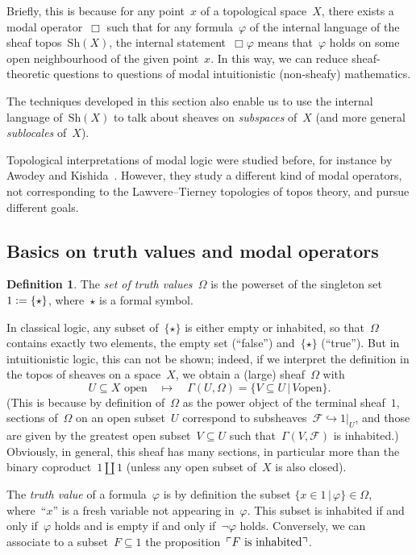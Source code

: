 \documentclass[10pt]{amsart}
\theoremstyle{definition}
\newtheorem{defn}{Definition}[section]
\theoremstyle{plain}
\theoremstyle{remark}
\newcommand{\F}{\mathcal{F}}
\newcommand{\Sh}{\mathrm{Sh}}
\newcommand{\?}{\,{:}\,}
\renewcommand{\_}{\mathpunct{.}\,}
\newcommand{\speak}[1]{\ulcorner\text{\textnormal{#1}}\urcorner}
\newcommand{\defeq}{\vcentcolon=}
\begin{document}
Briefly, this is because for any point~$x$ of a topological space~$X$, there
exists a modal operator~$\Box$ such that for any formula~$\varphi$ of the
internal language of the sheaf topos~$\Sh(X)$, the internal
statement~$\Box\varphi$ means that~$\varphi$ holds on some open neighbourhood
of the given point~$x$. In this way, we can reduce sheaf-theoretic questions to
questions of modal intuitionistic (non-sheafy) mathematics.

The techniques developed in this section also enable us to use the internal
language of~$\Sh(X)$ to talk about sheaves on \emph{subspaces} of~$X$ (and more
general \emph{sublocales} of~$X$).

Topological interpretations of modal logic were studied before, for instance by
Awodey and Kishida~\cite{awodey-kishida:modal}. However, they study a
different kind of modal operators, not corresponding to the Lawvere--Tierney
topologies of topos theory, and pursue different goals.


\subsection{Basics on truth values and modal operators}

\begin{defn}The \emph{set of truth values~$\Omega$} is the powerset of the
singleton set~$1 \defeq \{\star\}$, where~$\star$ is a formal symbol.\end{defn}

In classical logic, any subset of~$\{\star\}$ is either empty or inhabited, so
that~$\Omega$ contains exactly two elements, the empty set (``false'')
and~$\{\star\}$ (``true''). But
in intuitionistic logic, this can not be shown; indeed, if we interpret the
definition in the topos of sheaves on a space~$X$, we obtain a (large) sheaf~$\Omega$
with
\[ \text{$U \subseteq X$ open} \quad\longmapsto\quad \Gamma(U,\Omega) = \{ V \subseteq U \,|\, \text{$V$
open} \}. \]
(This is because by definition of~$\Omega$ as the power object of the terminal
sheaf~$1$, sections of~$\Omega$ on an open subset~$U$ correspond to
subsheaves~$\F \hookrightarrow 1|_U$, and those are given by the greatest open
subset~$V \subseteq U$ such that~$\Gamma(V,\F)$ is inhabited.)
Obviously, in general, this sheaf has many sections, in particular more than
the binary coproduct~$1 \amalg 1$ (unless any open subset of~$X$ is also
closed).

The \emph{truth value} of a formula~$\varphi$ is by definition the subset
$\{ x \in 1 \,|\, \varphi \} \in \Omega$, where~``$x$'' is a fresh variable not
appearing in~$\varphi$. This subset is inhabited if and only
if~$\varphi$ holds and is empty if and only if~$\neg\varphi$ holds.
Conversely, we can associate to a subset~$F \subseteq 1$ the
proposition~$\speak{$F$ is inhabited}$.
\end{document}

